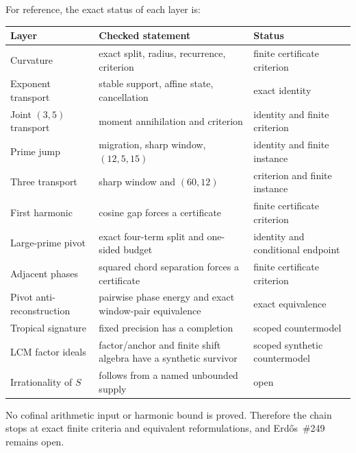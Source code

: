 \documentclass[11pt]{article}
\theoremstyle{remark}\newtheorem*{remark}{Remark}
\begin{document}
For reference, the exact status of each layer is:
\begin{center}\small
\begin{tabular}{@{}
>{\raggedright\arraybackslash}p{}
>{\raggedright\arraybackslash}p{}
>{\raggedright\arraybackslash}p{}@{}}
\toprule Layer & Checked statement & Status \\
\midrule
Curvature & exact split, radius, recurrence, criterion & finite certificate criterion \\
Exponent transport & stable support, affine state, cancellation & exact identity \\
Joint $(3,5)$ transport & moment annihilation and criterion & identity and finite criterion \\
Prime jump & migration, sharp window, $(12,5,15)$ & identity and finite instance \\
Three transport & sharp window and $(60,12)$ & criterion and finite instance \\
First harmonic & cosine gap forces a certificate & finite certificate criterion \\
Large-prime pivot & exact four-term split and one-sided budget & identity and conditional endpoint \\
Adjacent phases & squared chord separation forces a certificate & finite certificate criterion \\
Pivot anti-reconstruction & pairwise phase energy and exact window-pair equivalence & exact equivalence \\
Tropical signature & fixed precision has a completion & scoped countermodel \\
LCM factor ideals & factor/anchor and finite shift algebra have a synthetic survivor & scoped synthetic countermodel \\
Irrationality of $S$ & follows from a named unbounded supply & open \\
\bottomrule
\end{tabular}
\end{center}
No cofinal arithmetic input or harmonic bound is proved.  Therefore the chain
stops at exact finite criteria and equivalent reformulations, and
Erd\H{o}s~\#249 remains open.
\end{document}
